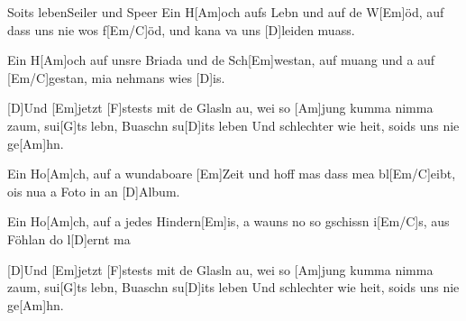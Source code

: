 \documentclass[../main.tex]{subfiles}
\begin{document}
\begin{song}[5]{Soits leben}{Seiler und Speer}{}
Ein H[Am]och aufs Lebn und auf de W[Em]{ö}d,
auf dass uns nie wos f[Em/C]{ö}d,
und kana va uns [D]leiden muass.

Ein H[Am]och auf unsre Briada und de Sch[Em]westan,
auf muang und a auf [Em/C]gestan,
mia nehmans wies [D]is.

[D]Und [Em]jetzt [F]stests mit de Glasln au,
wei so [Am]jung kumma nimma zaum,
sui[G]ts lebn, Buaschn su[D]its leben
Und schlechter wie heit, soids uns nie ge[Am]hn.

Ein Ho[Am]ch, auf a wundaboare [Em]Zeit
und hoff mas dass mea bl[Em/C]eibt,
ois nua a Foto in an [D]Album.

Ein Ho[Am]ch, auf a jedes Hindern[Em]is,
a wauns no so gschissn i[Em/C]s,
aus Föhlan do l[D]ernt ma

[D]Und [Em]jetzt [F]stests mit de Glasln au,
wei so [Am]jung kumma nimma zaum,
sui[G]ts lebn, Buaschn su[D]its leben
Und schlechter wie heit, soids uns nie ge[Am]hn.
\end{song}
\end{document}
